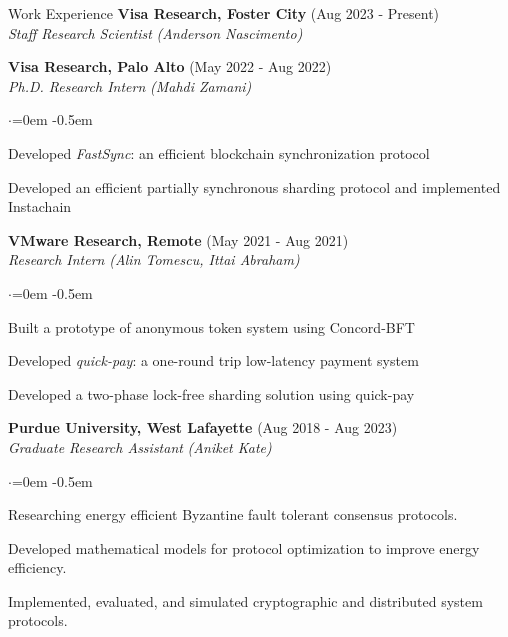 \documentclass{resume}
\begin{document}
\begin{rSection}{Work Experience}
\label{sec:org4fcb349}
\textbf{Visa Research, Foster City}  \hfill  (Aug 2023 - Present)\\[0pt]
\emph{Staff Research Scientist}  \hfill  \emph{(Anderson Nascimento)}


\textbf{Visa Research, Palo Alto}  \hfill  (May 2022 - Aug 2022)\\[0pt]
\emph{Ph.D. Research Intern}  \hfill  \emph{(Mahdi Zamani)}
\begin{list}{$\cdot$}{\leftmargin=0em}
\itemsep -0.5em \vspace{-0.5em} %
 \item   Developed \emph{FastSync}: an efficient blockchain synchronization protocol 
 \item   Developed an efficient partially synchronous sharding protocol and implemented Instachain
\end{list}
\vspace{0.5em} %

\textbf{VMware Research, Remote}  \hfill  (May 2021 - Aug 2021)\\[0pt]
\emph{Research Intern}  \hfill  \emph{(Alin Tomescu, Ittai Abraham)}
\begin{list}{$\cdot$}{\leftmargin=0em}
\itemsep -0.5em \vspace{-0.5em} %
 \item   Built a prototype of anonymous token system using Concord-BFT 
 \item   Developed \emph{quick-pay}: a one-round trip low-latency payment system 
 \item   Developed a two-phase lock-free sharding solution using quick-pay
\end{list}
\vspace{0.5em} %

\textbf{Purdue University, West Lafayette}  \hfill  (Aug 2018 - Aug 2023)\\[0pt]
\emph{Graduate Research Assistant}  \hfill  \emph{(Aniket Kate)}
\begin{list}{$\cdot$}{\leftmargin=0em}
\itemsep -0.5em \vspace{-0.5em} %
 \item   Researching energy efficient Byzantine fault tolerant consensus protocols. 
 \item   Developed mathematical models for protocol optimization to improve energy efficiency. 
 \item   Implemented, evaluated, and simulated cryptographic and distributed system protocols.
\end{list}
\vspace{0.5em} %


\end{rSection}
\end{document}
